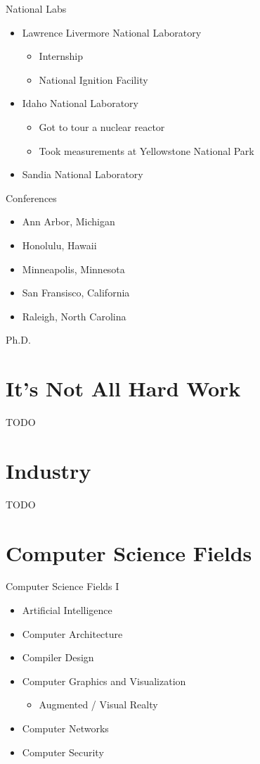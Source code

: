 \documentclass{beamer}
\begin{document}
\begin{frame}{National Labs}
\begin{itemize}
	\item Lawrence Livermore National Laboratory
	\begin{itemize}
		\item Internship
		\item National Ignition Facility
	\end{itemize}
	\item Idaho National Laboratory
	\begin{itemize}
		\item Got to tour a nuclear reactor
		\item Took measurements at Yellowstone National Park
	\end{itemize}
	\item Sandia National Laboratory
\end{itemize}
\end{frame}


\begin{frame}{Conferences}
\begin{itemize}
	\item Ann Arbor, Michigan
	\item Honolulu, Hawaii
	\item Minneapolis, Minnesota
	\item San Fransisco, California
	\item Raleigh, North Carolina 
\end{itemize}
\end{frame}

\begin{frame}{Ph.D.}
\end{frame}

\section{It's Not All Hard Work}
TODO

\section{Industry}
TODO

\section{Computer Science Fields}

\begin{frame}{Computer Science Fields I}
\begin{itemize}
	\item Artificial Intelligence
	\item Computer Architecture
	\item Compiler Design
	\item Computer Graphics and Visualization
	\begin{itemize}
		\item Augmented / Visual Realty
	\end{itemize}
	\item Computer Networks
	\item Computer Security
\end{itemize}
\end{frame}
\end{document}
